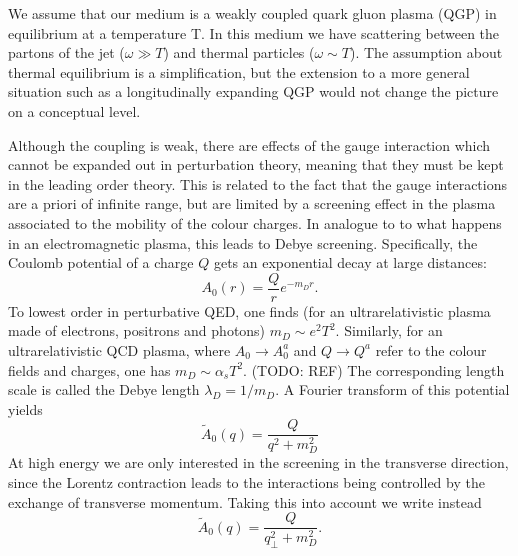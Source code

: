 \documentclass[a4paper,12pt]{article}
\numberwithin{equation}{section}
\begin{document}
We assume that our medium is a weakly coupled quark gluon plasma (QGP) in equilibrium at a temperature T. In this medium we have scattering between the partons of the jet ($\omega \gg T$) and thermal particles ($\omega \sim T$). The assumption about thermal equilibrium is a simplification, but the extension to a more general situation such as a longitudinally expanding QGP would not change the picture on a conceptual level.


Although the coupling is weak, there are effects of the gauge interaction which cannot be expanded out in perturbation theory, meaning that they must be kept in the leading order theory. This is related to the fact that the gauge interactions are a priori of infinite range, but are limited by a screening effect in the plasma associated to the mobility of the colour charges. In analogue to to what happens in an electromagnetic plasma, this leads to Debye screening. Specifically, the Coulomb potential of a charge $Q$ gets an exponential decay at large distances:
\begin{equation}
A_0(r)=\frac{Q}{r}e^{-m_Dr}.
\end{equation}
To lowest order in perturbative QED, one finds (for an ultrarelativistic plasma made of electrons, positrons and photons) $m_D\sim e^2 T^2$. Similarly, for an ultrarelativistic QCD plasma, where $A_0\rightarrow A_0^a$ and $Q\rightarrow Q^a$ refer to the colour fields and charges, one has $m_D\sim \alpha_s T^2$. (TODO: REF) The corresponding length scale is called the Debye length $\lambda_D=1/m_D$.
A Fourier transform of this potential yields
\begin{equation}
\tilde{A}_0(q)=\frac{Q}{q^2+m_D^2}
\end{equation}
At high energy we are only interested in the screening in the transverse direction, since the Lorentz contraction leads to the interactions being controlled by the exchange of transverse momentum. Taking this into account we write instead 
\begin{equation}\label{Debye}
\tilde{A}_0(q)=\frac{Q}{q_\perp^2+m_D^2}.
\end{equation}
\end{document}
